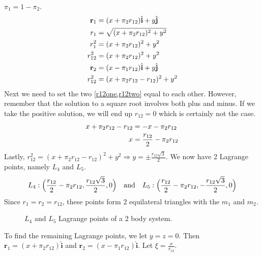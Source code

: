 \(\pi_1 = 1 - \pi_2\).
\begin{align}
  \mathbf{r}_1
  & = (x + \pi_2r_{12})\hat{\mathbf{i}} + y\hat{\mathbf{j}}\notag\\
  r_1
  & = \sqrt{(x + \pi_2r_{12})^2 + y^2}\notag\\
  r_1^2
  & = (x + \pi_2r_{12})^2 + y^2\notag\\
  r_{12}^2
  & = (x + \pi_2r_{12})^2 + y^2\label{r12one}\\
  \mathbf{r}_2
  & = (x - \pi_1r_{12})\hat{\mathbf{i}} + y\hat{\mathbf{j}}\notag\\
  r_{12}^2 & = (x + \pi_2r_{12} - r_{12})^2 + y^2\label{r12two}
\end{align}
Next we need to set the two \cref{r12one,r12two} equal to each other. 
However, remember that the solution to a square root involves both plus and
minus.
If we take the positive solution, we will end up \(r_{12} = 0\) which is
certainly not the case.
\begin{align} 
  x + \pi_2r_{12} - r_{12} & = -x - \pi_2r_{12}\notag\\
  x & = \frac{r_{12}}{2} - \pi_2r_{12}\label{xsolnsec5}
\end{align}
Lastly,
\(r_{12}^2 = (x + \pi_2r_{12} - r_{12})^2 + y^2\Rightarrow y
= \pm\frac{r_{12}\sqrt{3}}{2}\).
We now have 2 Lagrange points, namely \(L_4\) and \(L_5\).
\[ 
L_4 {}:{} \Bigl(\frac{r_{12}}{2} - \pi_2r_{12}, \frac{r_{12}\sqrt{3}}{2},
0\Bigr)
\quad\text{and}\quad
L_5 {}:{} \Bigl(\frac{r_{12}}{2} - \pi_2r_{12}, - \frac{r_{12}\sqrt{3}}{2},
0\Bigr)
\]
Since \(r_1 = r_2 = r_{12}\), these points form 2 equilateral triangles with
the \(m_1\) and \(m_2\).
\begin{figure}
  \centering
  
  \caption[\(L_4\) and \(L_5\) Lagrange Points]
  {\(L_4\) and \(L_5\) Lagrange points of a 2 body system.}
  \label{lagrangepoints}
\end{figure}
To find the remaining Lagrange points, we let \(y = z = 0\).
Then \(\mathbf{r}_1 = (x + \pi_2r_{12})\hat{\mathbf{i}}\) and
\(\mathbf{r}_2 = (x - \pi_1r_{12})\hat{\mathbf{i}}\).
Let \(\xi = \frac{x}{r_{12}}\).
